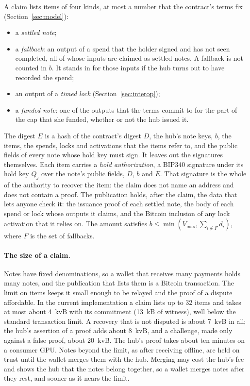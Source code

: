 \documentclass[11pt]{article}
\newcommand{\vmax}{V_{\max}}
\begin{document}
A claim lists items of four kinds, at most a number that the contract's terms fix (Section~\ref{sec:model}):
\begin{itemize}[leftmargin=1.5em, itemsep=0pt]
\item a \emph{settled note};
\item a \emph{fallback}: an output of a spend that the holder signed and has not seen completed, all of whose inputs are claimed as settled notes. A fallback is not counted in $b$. It stands in for those inputs if the hub turns out to have recorded the spend;
\item an output of a \emph{timed lock} (Section~\ref{sec:interop});
\item a \emph{funded note}: one of the outputs that the terms commit to for the part of the cap that she funded, whether or not the hub issued it.
\end{itemize}
The digest $E$ is a hash of the contract's digest $D$, the hub's note keys, $b$, the items, the spends, locks and activations that the items refer to, and the public fields of every note whose hold key must sign. It leaves out the signatures themselves. Each item carries a \emph{hold authorization}, a BIP340 signature under its hold key $Q_j$ over the note's public fields, $D$, $b$ and $E$. That signature is the whole of the authority to recover the item: the claim does not name an address and does not contain a proof. The publication holds, after the claim, the data that lets anyone check it: the issuance proof of each settled note, the body of each spend or lock whose outputs it claims, and the Bitcoin inclusion of any lock activation that it relies on. The amount satisfies $b \le \min(\vmax, \sum_{i\notin F} d_i)$, where $F$ is the set of fallbacks.

\paragraph{The size of a claim.} Notes have fixed denominations, so a wallet that receives many payments holds many notes, and the publication that lists them is a Bitcoin transaction. The limit on items keeps it small enough to be relayed and the proof of a dispute affordable. In the current implementation a claim lists up to 32 items and takes at most about 4~kvB with its commitment (13~kB of witness), well below the standard transaction limit. A recovery that is not disputed is about 7~kvB in all; the hub's assertion of a proof adds about 8~kvB, and a challenge, made only against a false proof, about 20~kvB. The hub's proof takes about ten minutes on a consumer GPU. Notes beyond the limit, as after receiving offline, are held on trust until the wallet merges them with the hub. Merging may cost the hub's fee and shows the hub that the notes belong together, so a wallet merges notes after they rest, and sooner as it nears the limit.
\end{document}
